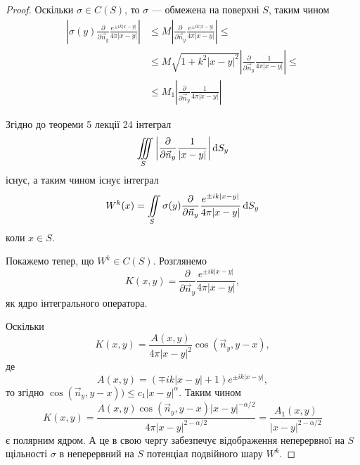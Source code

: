 \begin{proof}
	Оскільки $\sigma \in C(S)$, то $\sigma$ --- обмежена на поверхні $S$, таким чином
	\begin{equation}
		\begin{aligned}
			\left| \sigma(y) \frac{\partial}{\partial \vec n_y} \frac{e^{\pm i k |x - y|}}{4 \pi |x - y|} \right| &\le M \left| \frac{\partial}{\partial \vec n_y} \frac{e^{\pm i k |x - y|}}{4 \pi |x - y|} \right| \le \\
			&\le M \sqrt{1 + k^2 |x - y|^2} \left| \frac{\partial}{\partial \vec n_y} \frac{1}{4 \pi |x - y|} \right| \le \\
			&\le M_1 \left| \frac{\partial}{\partial \vec n_y} \frac{1}{4 \pi |x - y|} \right|
		\end{aligned}
	\end{equation}

	Згідно до теореми 5 лекції 24 інтеграл
	\begin{equation}
		\displaystyle\iiint\limits_S \left| \frac{\partial}{\partial \vec n_y} \frac{1}{|x - y|} \right| \mathop{}\!\mathrm{d} S_y
	\end{equation}
	існує, а таким чином існує інтеграл
	\begin{equation}
		W^k(x) = \displaystyle\iint\limits_S \sigma(y) \frac{\partial}{\partial \vec n_y} \frac{e^{\pm i k |x - y|}}{4 \pi |x - y|} \mathop{}\!\mathrm{d} S_y
	\end{equation}
	коли $x \in S$. \medskip

	Покажемо тепер, що $W^k \in C(S)$. Розглянемо
	\begin{equation}
		K(x, y) = \frac{\partial}{\partial \vec n_y} \frac{e^{\pm i k |x - y|}}{4 \pi |x - y|},
	\end{equation}
	як ядро інтегрального оператора. \medskip
	
	Оскільки
	\begin{equation}
		K(x, y) = \frac{A(x, y)}{4 \pi |x - y|^2} \cos(\vec n_y, y - x),
	\end{equation}
	де
	\begin{equation}
		A(x, y) = (\mp i k |x - y| + 1) e^{\pm i k |x - y|},
	\end{equation}
	то згідно  $\cos(\vec n_y, y - x)) \le c_1 |x - y|^\alpha$. Таким чином
	\begin{equation}
		K(x, y) = \frac{A(x, y) \cos(\vec n_y, y - x) |x - y|^{-\alpha/2}}{4 \pi |x - y|^{2-\alpha/2}} = \frac{A_1(x, y)}{|x - y|^{2-\alpha/2}}
	\end{equation}
	є полярним ядром. А це в свою чергу забезпечує відображення неперервної на $S$ щільності $\sigma$ в неперервний на $S$ потенціал подвійного шару $W^k$.
\end{proof}

